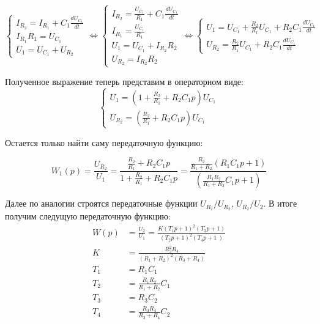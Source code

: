 \documentclass[a4paper, 12pt]{article}
\begin{document}
\begin{equation*}
    \begin{cases}
        I_{R_2} = I_{R_1} + C_1\frac{dU_{C_1}}{dt} \\
        I_{R_1}R_1 = U_{C_1} \\
        U_1 = U_{C_1} + U_{R_2}
    \end{cases}
    \Leftrightarrow
    \begin{cases}
        I_{R_2} = \frac{U_{C_1}}{R_1} + C_1\frac{dU_{C_1}}{dt} \\
        I_{R_1} = \frac{U_{C_1}}{R_1} \\
        U_1 = U_{C_1} + I_{R_2}R_2 \\
        U_{R_2} = I_{R_2}R_2
    \end{cases}
    \Leftrightarrow
    \begin{cases}
        U_1 = U_{C_1} + \frac{R_2}{R_1}U_{C_1} + R_2C_1\frac{dU_{C_1}}{dt} \\
        U_{R_2} = \frac{R_2}{R_1}U_{C_1} + R_2C_1\frac{dU_{C_1}}{dt}
    \end{cases}
\end{equation*} \par
Полученное выражение теперь представим в операторном виде:
\begin{equation*}
    \begin{cases}
        U_1 = \left( 1 + \frac{R_2}{R_1} + R_2C_1p \right) U_{C_1} \\
        U_{R_2} = \left( \frac{R_2}{R_1} + R_2C_1p \right) U_{C_1}
    \end{cases}
\end{equation*} \par

Остается только найти саму передаточную функцию: \par
\begin{equation}
    W_1(p) = \frac{U_{R_2}}{U_1} = \frac{\frac{R_2}{R_1} + R_2C_1p}{1 + \frac{R_2}{R_1} + R_2C_1p} = \frac{\frac{R_2}{R_1 + R_2}\left( R_1C_1p + 1 \right)}{\left( \frac{R_1R_2}{R_1 + R_2}C_1p + 1 \right)}
\end{equation}

Далее по аналогии строятся передаточные функции $U_{R_2}/U_{R_2}$, $U_{R_2}/U_2$. В итоге получим следущую передаточную функцию:
\begin{align}
    W(p) & = \frac{U_2}{U_1} = \frac{K\left(T_1p + 1 \right)^2 \left( T_3p + 1 \right)}{\left( T_2p + 1 \right)^2 \left( T_4p + 1 \ \right)} \\
    K & = \frac{R_2^2R_4}{(R_1 + R_2)^2(R_3 + R_4)} \\
    T_1 & = R_1C_1 \\
    T_2 & = \frac{R_1R_2}{R_1 + R_2}C_1 \\
    T_3 & = R_3C_2 \\
    T_4 & = \frac{R_3R_4}{R_3 + R_4}C_2
\end{align}
\end{document}
